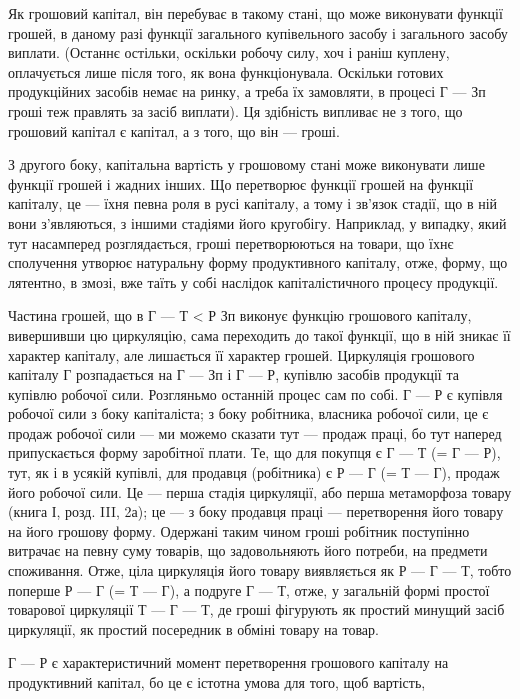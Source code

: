 Як грошовий капітал, він перебуває в такому стані, що може виконувати
функції грошей, в даному разі функції загального купівельного
засобу і загального засобу виплати. (Останнє остільки, оскільки робочу
силу, хоч і раніш куплену, оплачується лише після того, як вона функціонувала.
Оскільки готових продукційних засобів немає на ринку, а
треба їх замовляти, в процесі Г — Зп гроші теж правлять за засіб виплати).
Ця здібність випливає не з того, що грошовий капітал є капітал, а з
того, що він — гроші.

З другого боку, капітальна вартість у грошовому стані може виконувати
лише функції грошей і жадних інших. Що перетворює функції
грошей на функції капіталу, це — їхня певна роля в русі капіталу, а тому
і зв’язок стадії, що в ній вони з’являються, з іншими стадіями його
кругобігу. Наприклад, у випадку, який тут насамперед розглядається,
гроші перетворюються на товари, що їхнє сполучення утворює натуральну
форму продуктивного капіталу, отже, форму, що лятентно, в
змозі, вже таїть у собі наслідок капіталістичного процесу продукції.

Частина грошей, що в Г — Т < Р Зп виконує функцію грошового капіталу, вивершивши цю циркуляцію, сама
переходить до такої функції, що в
ній зникає її характер капіталу, але лишається її характер грошей. Циркуляція
грошового капіталу Г розпадається на Г — Зп і Г — Р, купівлю
засобів продукції та купівлю робочої сили. Розгляньмо останній процес
сам по собі. Г — Р є купівля робочої сили з боку капіталіста; з боку
робітника, власника робочої сили, це є продаж робочої сили — ми можемо
сказати тут — продаж праці, бо тут наперед припускається форму заробітної
плати. Те, що для покупця є Г — Т (= Г — Р), тут, як і в усякій
купівлі, для продавця (робітника) є Р — Г (= Т — Г), продаж його робочої
сили. Це — перша стадія циркуляції, або перша метаморфоза товару
(книга І, розд. III, 2а); це — з боку продавця праці — перетворення його
товару на його грошову форму. Одержані таким чином гроші робітник
поступінно витрачає на певну суму товарів, що задовольняють його
потреби, на предмети споживання. Отже, ціла циркуляція його товару
виявляється як Р — Г — Т, тобто поперше Р — Г (= Т — Г), а подруге Г — Т,
отже, у загальній формі простої товарової циркуляції Т — Г — Т, де гроші
фігурують як простий минущий засіб циркуляції, як простий посередник
в обміні товару на товар.

Г — Р є характеристичний момент перетворення грошового капіталу
на продуктивний капітал, бо це є істотна умова для того, щоб вартість,
\parbreak{}  %
